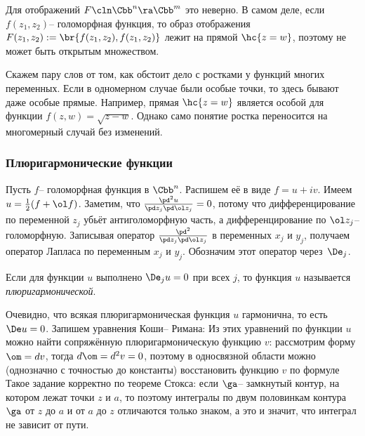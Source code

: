 \documentclass[a4paper]{article}
\begin{document}
\begin{note}
Для отображений $F\cln \Cbb^n \ra \Cbb^m$ это неверно. В самом деле, если $f(z_1,z_2)$-- голоморфная функция,
то образ отображения $F(z_1,z_2) := \br{f(z_1,z_2),f(z_1,z_2)}$ лежит на прямой $\hc{z = w}$, поэтому
не может быть открытым множеством.
\end{note}

\medskip

Скажем пару слов от том, как обстоит дело с ростками у функций многих переменных.
Если в одномерном случае были особые точки, то здесь бывают даже особые прямые. Например, прямая $\hc{z = w}$
является особой для функции $f(z,w) = \sqrt{z - w}$. Однако само понятие ростка переносится на
многомерный случай без изменений.

\subsubsection{Плюригармонические функции}

Пусть $f$-- голоморфная функция в $\Cbb^n$. Распишем её в виде $f = u + iv$.
Имеем $u = \frac12(f + \ol f)$. Заметим, что
$\frac{\pd^2u}{\pd z_j \pd \ol z_j} = 0$, потому что дифференцирование по переменной $z_j$
убьёт антиголоморфную часть, а дифференцирование по $\ol z_j$-- голоморфную. Записывая оператор
$\frac{\pd^2}{\pd z_j \pd \ol z_j}$ в переменных $x_j$ и $y_j$, получаем оператор Лапласа по
переменным $x_j$ и $y_j$. Обозначим этот оператор через~$\De_j$.

\begin{df}
Если для функции $u$ выполнено $\De_j u = 0$ при всех $j$, то функция $u$ называется
\emph{плюригармонической}.
\end{df}

Очевидно, что всякая плюригармоническая функция $u$ гармонична, то есть $\De u = 0$.
Запишем уравнения Коши-- Римана:
Из этих уравнений по функции $u$ можно найти сопряжённую плюригармоническую функцию $v$:
рассмотрим форму $\om = dv$, тогда $d\om = d^2v = 0$, поэтому в односвязной области можно
(однозначно с точностью до константы) восстановить функцию $v$ по формуле
Такое задание корректно по теореме Стокса: если $\ga$-- замкнутый контур, на котором
лежат точки $z$ и $a$, то
поэтому интегралы по двум половинкам контура $\ga$ от $z$ до $a$ и от $a$ до $z$ отличаются
только знаком, а это и значит, что интеграл не зависит от пути.
\end{document}
